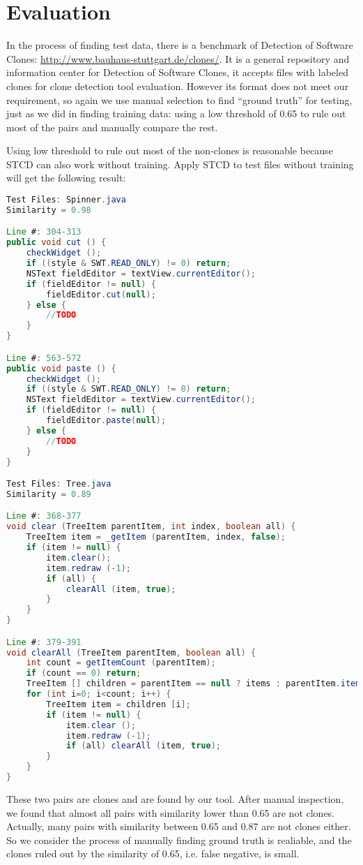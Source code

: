 \documentclass[../main.tex]{subfiles}
\begin{document}
\section{Evaluation}

In the process of finding test data, there is a benchmark of Detection of Software Clones: {\color{blue} \url{http://www.bauhaus-stuttgart.de/clones/}}. It is a general repository and information center for Detection of Software Clones, it accepts files with labeled clones for clone detection tool evaluation. However its format does not meet our requirement, so again we use manual selection to find ``ground truth'' for testing, just as we did in finding training data: using a low threshold of 0.65 to rule out most of the pairs and manually compare the rest.

Using low threshold to rule out most of the non-clones is reasonable because STCD can also work without training. Apply STCD to test files without training will get the following result:


\begin{lstlisting}[basicstyle=\footnotesize, language=Java]
Test Files: Spinner.java
Similarity = 0.98

Line #: 304-313
public void cut () {
	checkWidget ();
	if ((style & SWT.READ_ONLY) != 0) return;
	NSText fieldEditor = textView.currentEditor();
	if (fieldEditor != null) {
		fieldEditor.cut(null);
	} else {
		//TODO
	}
}

Line #: 563-572
public void paste () {
	checkWidget ();
	if ((style & SWT.READ_ONLY) != 0) return;
	NSText fieldEditor = textView.currentEditor();
	if (fieldEditor != null) {
		fieldEditor.paste(null);
	} else {
		//TODO
	}
}

Test Files: Tree.java
Similarity = 0.89

Line #: 368-377
void clear (TreeItem parentItem, int index, boolean all) {
	TreeItem item = _getItem (parentItem, index, false);
	if (item != null) {
		item.clear();
		item.redraw (-1);
		if (all) {
			clearAll (item, true);
		}
	}
}

Line #: 379-391
void clearAll (TreeItem parentItem, boolean all) {
	int count = getItemCount (parentItem);
	if (count == 0) return;
	TreeItem [] children = parentItem == null ? items : parentItem.items; 
	for (int i=0; i<count; i++) {
		TreeItem item = children [i];
		if (item != null) {
			item.clear ();
			item.redraw (-1);
			if (all) clearAll (item, true);
		}
	}
}
\end{lstlisting}

These two pairs are clones and are found by our tool. After manual inspection, we found that almost all pairs with similarity lower than 0.65 are not clones. Actually, many pairs with similarity between 0.65 and 0.87 are not clones either. So we consider the process of manually finding ground truth is realiable, and the clones ruled out by the similarity of 0.65, i.e. false negative, is small.
\end{document}
